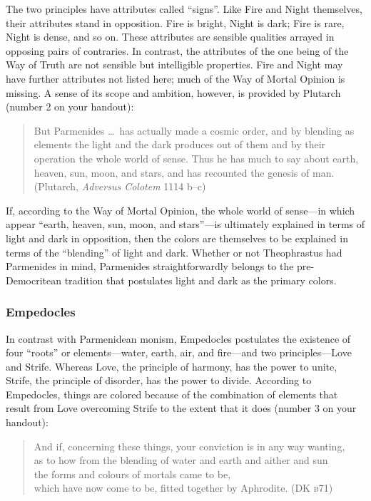 The two principles have attributes called ``signs''. Like Fire and Night themselves, their attributes stand in opposition. Fire is bright, Night is dark; Fire is rare, Night is dense, and so on. These attributes are sensible qualities arrayed in opposing pairs of contraries. In contrast, the attributes of the one being of the Way of Truth are not sensible but intelligible properties. Fire and Night may have further attributes not listed here; much of the Way of Mortal Opinion is missing. A sense of its scope and ambition, however, is provided by Plutarch (number 2 on your handout):
\begin{quote}
    But Parmenides \ldots\ has actually made a cosmic order, and by blending as elements the light and the dark produces out of them and by their operation the whole world of sense. Thus he has much to say about earth, heaven, sun, moon, and stars, and has recounted the genesis of man. (Plutarch, \emph{Adversus Colotem} 1114 b--c)
\end{quote}
If, according to the Way of Mortal Opinion, the whole world of sense---in which appear ``earth, heaven, sun, moon, and stars''---is ultimately explained in terms of light and dark in opposition, then the colors are themselves to be explained in terms of the ``blending'' of light and dark. Whether or not Theophrastus had Parmenides in mind, Parmenides straightforwardly belongs to the pre-Democritean tradition that postulates light and dark as the primary colors. \change


\begin{frame}[t]\frametitle{Empedocles}
	
\end{frame}

In contrast with Parmenidean monism, Empedocles postulates the existence of four ``roots'' or elements---water, earth, air, and fire---and two principles---\-Love and Strife. Whereas Love, the principle of harmony, has the power to unite, Strife, the principle of disorder, has the power to divide. According to Empedocles, things are colored because of the combination of elements that result from Love overcoming Strife to the extent that it does (number 3 on your handout):
\begin{verse}
    And if, concerning these things, your conviction is in any way wanting,\\
    as to how from the blending of water and earth and aither and sun\\
    the forms and colours of mortals came to be,\\
    which have now come to be, fitted together by Aphrodite.
    (DK \textsc{b}71)
\end{verse}

